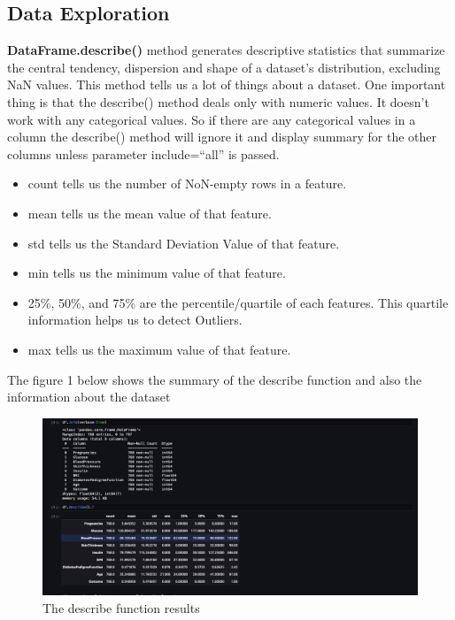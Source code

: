 \documentclass[
]{article}
\providecommand{\tightlist}{%
  \setlength{\itemsep}{0pt}\setlength{\parskip}{0pt}}
\begin{document}
\hypertarget{data-exploration}{%
\subsection{Data Exploration}\label{data-exploration}}

\textbf{DataFrame.describe()} method generates descriptive statistics
that summarize the central tendency, dispersion and shape of a dataset's
distribution, excluding NaN values. This method tells us a lot of things
about a dataset. One important thing is that the describe() method deals
only with numeric values. It doesn't work with any categorical values.
So if there are any categorical values in a column the describe() method
will ignore it and display summary for the other columns unless
parameter include=``all'' is passed.

\begin{itemize}
\tightlist
\item
  count tells us the number of NoN-empty rows in a feature.
\item
  mean tells us the mean value of that feature.
\item
  std tells us the Standard Deviation Value of that feature.
\item
  min tells us the minimum value of that feature.
\item
  25\%, 50\%, and 75\% are the percentile/quartile of each features.
  This quartile information helps us to detect Outliers.
\item
  max tells us the maximum value of that feature.
\end{itemize}

The figure 1 below shows the summary of the describe function and also
the information about the dataset

\begin{figure}
\centering
\includegraphics{describe.png}
\caption{The describe function results}
\end{figure}
\end{document}
